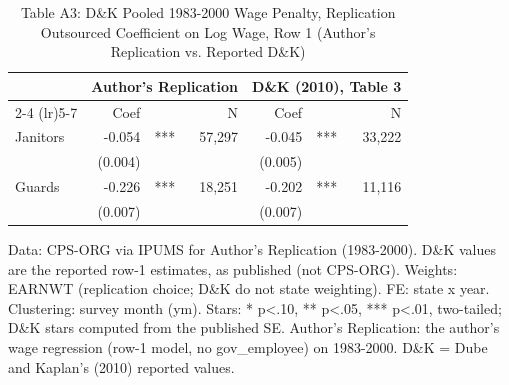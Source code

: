\begin{table}[!t]
\caption*{
{\large Table A3: D\&K Pooled 1983-2000 Wage Penalty, Replication} \\
{\small Outsourced Coefficient on Log Wage, Row 1 (Author's Replication vs. Reported D\&K)}
} 

\fontsize{10.0pt}{12.0pt}\selectfont

\centering\begin{tabular}{l|rlrrlr}
\toprule
  & \multicolumn{3}{c}{Author's Replication} & \multicolumn{3}{c}{D\&K (2010), Table 3} \\ 
\cmidrule(lr){2-4} \cmidrule(lr){5-7}
  & Coef &  & N & Coef &  & N \\ 
\midrule\addlinespace[2.5pt]
Janitors & -0.054 & *** & 57,297 & -0.045 & *** & 33,222 \\
 & (0.004) &  &  & (0.005) &  &  \\
Guards & -0.226 & *** & 18,251 & -0.202 & *** & 11,116 \\
 & (0.007) &  &  & (0.007) &  &  \\
\bottomrule
\end{tabular}\par\raggedright
\begin{minipage}{\linewidth}
Data: CPS-ORG via IPUMS for Author's Replication (1983-2000). D\&K values are the reported row-1 estimates, as published (not CPS-ORG). Weights: EARNWT (replication choice; D\&K do not state weighting). FE: state x year. Clustering: survey month (ym). Stars: * p<.10, ** p<.05, *** p<.01, two-tailed; D\&K stars computed from the published SE. Author's Replication: the author's wage regression (row-1 model, no gov\_employee) on 1983-2000. D\&K = Dube and Kaplan's (2010) reported values.\\
\end{minipage}
\end{table}
